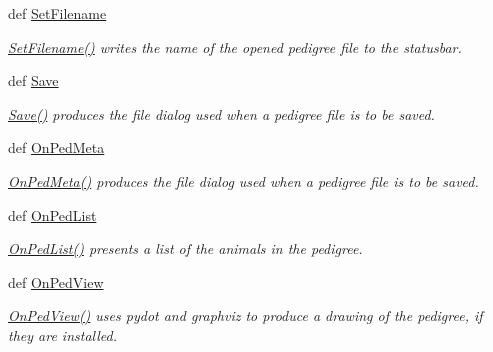 \begin{DoxyCompactItemize}
\item 
def \hyperlink{classPyPedal_1_1pyp__gui_1_1MainWindow_adce24bc60289ad97dbfdbc135ee317ae}{SetFilename}
\begin{DoxyCompactList}\small\item\em \hyperlink{classPyPedal_1_1pyp__gui_1_1MainWindow_adce24bc60289ad97dbfdbc135ee317ae}{SetFilename()} writes the name of the opened pedigree file to the statusbar. \item\end{DoxyCompactList}\item 
def \hyperlink{classPyPedal_1_1pyp__gui_1_1MainWindow_ad94df6fc4f74bcece40708069184cc4d}{Save}
\begin{DoxyCompactList}\small\item\em \hyperlink{classPyPedal_1_1pyp__gui_1_1MainWindow_ad94df6fc4f74bcece40708069184cc4d}{Save()} produces the file dialog used when a pedigree file is to be saved. \item\end{DoxyCompactList}\item 
def \hyperlink{classPyPedal_1_1pyp__gui_1_1MainWindow_a31f6867d443118456d8bef449702674f}{OnPedMeta}
\begin{DoxyCompactList}\small\item\em \hyperlink{classPyPedal_1_1pyp__gui_1_1MainWindow_a31f6867d443118456d8bef449702674f}{OnPedMeta()} produces the file dialog used when a pedigree file is to be saved. \item\end{DoxyCompactList}\item 
def \hyperlink{classPyPedal_1_1pyp__gui_1_1MainWindow_a7b554d195845b6a92adf70de618a3615}{OnPedList}
\begin{DoxyCompactList}\small\item\em \hyperlink{classPyPedal_1_1pyp__gui_1_1MainWindow_a7b554d195845b6a92adf70de618a3615}{OnPedList()} presents a list of the animals in the pedigree. \item\end{DoxyCompactList}\item 
def \hyperlink{classPyPedal_1_1pyp__gui_1_1MainWindow_aaac0e9909c6b7e9b1a24231d2dc8e569}{OnPedView}
\begin{DoxyCompactList}\small\item\em \hyperlink{classPyPedal_1_1pyp__gui_1_1MainWindow_aaac0e9909c6b7e9b1a24231d2dc8e569}{OnPedView()} uses pydot and graphviz to produce a drawing of the pedigree, if they are installed. \item\end{DoxyCompactList}\item 

\end{DoxyCompactItemize}
